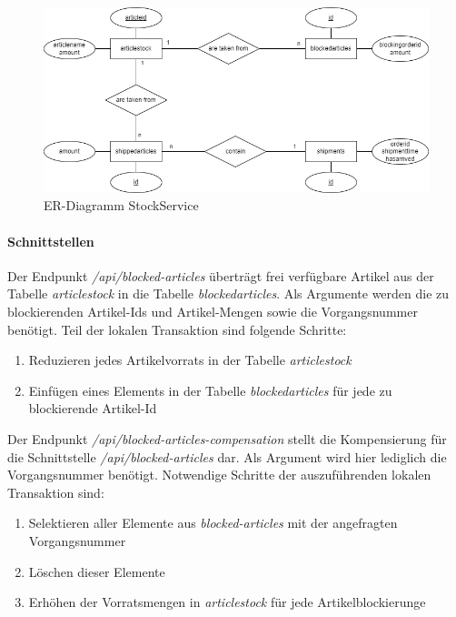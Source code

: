 \begin{figure}[h!]
	\centering
	\includegraphics[scale=0.5]{figures/DatabaseER/StockServiceTables.png}
	\caption{ER-Diagramm StockService}
\end{figure}
\FloatBarrier

\paragraph*{Schnittstellen}

Der Endpunkt \textit{/api/blocked-articles} überträgt frei verfügbare Artikel aus der Tabelle \textit{articlestock} in die Tabelle \textit{blockedarticles}. Als Argumente werden die zu blockierenden Artikel-Ids und Artikel-Mengen sowie die Vorgangsnummer benötigt. Teil der lokalen Transaktion sind folgende Schritte:
\begin{enumerate}
	\item Reduzieren jedes Artikelvorrats in der Tabelle \textit{articlestock}
	\item Einfügen eines Elements in der Tabelle \textit{blockedarticles} für jede zu blockierende Artikel-Id
\end{enumerate}

Der Endpunkt \textit{/api/blocked-articles-compensation} stellt die Kompensierung für die Schnittstelle \textit{/api/blocked-articles} dar. Als Argument wird hier lediglich die Vorgangsnummer benötigt. Notwendige Schritte der auszuführenden lokalen Transaktion sind:
\begin{enumerate}
	\item Selektieren aller Elemente aus \textit{blocked-articles} mit der angefragten Vorgangsnummer
	\item Löschen dieser Elemente
	\item Erhöhen der Vorratsmengen in \textit{articlestock} für jede Artikelblockierunge
\end{enumerate}

